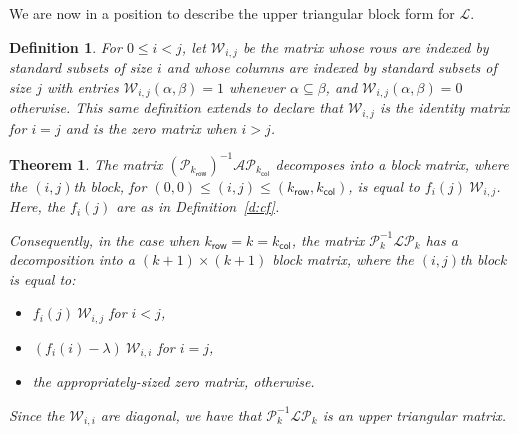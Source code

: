 \documentclass[11pt]{article}
\newtheorem{definition}[theo]{Definition}
\newtheorem{theorem}[theo]{Theorem}
\theoremstyle{definition}
\numberwithin{equation}{section}
\numberwithin{equation}{section}
\renewcommand{\L}{\mathcal{L}}
\renewcommand{\P}{\mathcal{P}}
\newcommand{\W}{\mathcal{W}}
\newcommand{\A}{\mathcal{A}}
\newcommand{\kr}{{k}_{\mathsf{row}}}
\newcommand{\kc}{{k}_{\mathsf{col}}}
\begin{document}
We are now in a position to describe the upper triangular block form for $\L$.  

\begin{definition}
For $0 \leq i < j$, let $\W_{i,j}$ be the matrix whose rows are indexed by standard subsets of size $i$ and whose columns are indexed by standard subsets of size $j$ with entries $\W_{i,j}(\alpha, \beta) = 1$ whenever $\alpha \subseteq \beta$, and $\W_{i,j}(\alpha, \beta) = 0$ otherwise.  This same definition extends to declare that $\W_{i,j}$ is the identity matrix for $i = j$ and is the zero matrix when $i > j$.
\end{definition}

\begin{theorem}\label{t:p_matrix}
The matrix $\left(\P_{\kr}\right)^{-1} \A \P_{\kc}$ decomposes into a block matrix, where the $(i, j)$th block, for $(0, 0) \leq (i, j) \leq (\kr, \kc)$, is equal to $f_i(j) \ \W_{i,j}$.  Here, the $f_i(j)$ are as in Definition~\ref{d:cf}.

Consequently, in the case when $\kr = k = \kc$, the matrix $\P_k^{-1} \L \P_{k}$ has a decomposition into a $(k+1) \times (k+1)$ block matrix, where the $(i, j)$th block is equal to:
\begin{itemize}
    \item $f_{i}(j) \ \W_{i,j}$ for $i < j$,
    \item $\left(f_{i}(i) - \lambda\right) \ \W_{i,i}$ for $i = j$,
    \item the appropriately-sized zero matrix, otherwise.
\end{itemize}
Since the $\W_{i,i}$ are diagonal, we have that $\P_k^{-1} \L \P_k$ is an upper triangular matrix.
\end{theorem}
\end{document}

